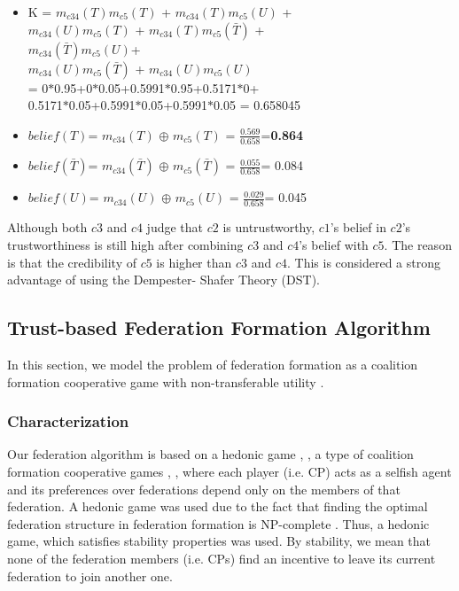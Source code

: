 \documentclass[preprint]{elsarticle}
\theoremstyle{definition}
\theoremstyle{remark}
\theoremstyle{property}
\begin{document}
\begin{itemize}
\item K = $m_{c34}(T)m_{c5}(T)$ + $m_{c34}(T)m_{c5}(U)$ + \\
$m_{c34}(U)m_{c5}(T)$ + $m_{c34}(T)m_{c5}(\bar{T})$ + \\ $m_{c34}(\bar{T})m_{c5}(U)$+ \\
$m_{c34}(U)m_{c5}(\bar{T})$ + $m_{c34}(U)m_{c5}(U)$ \\

= 0$\ast$0.95+0$\ast$0.05+0.5991$\ast$0.95+0.5171$\ast$0+ \\
0.5171$\ast$0.05+0.5991$\ast$0.05+0.5991$\ast$0.05 = 0.658045\\

\item $belief(T)$= $m_{c34}(T)$ $\oplus$ $m_{c5}(T)$ = $\frac{0.569}{0.658}$=\textbf{0.864} \\
\item $belief(\bar{T})$= $m_{c34}(\bar{T})$ $\oplus$ $m_{c5}(\bar{T})$ = $\frac{0.055}{0.658}$= 0.084 \\
\item $belief(U)$= $m_{c34}(U)$ $\oplus$ $m_{c5}(U)$ = $\frac{0.029}{0.658}$= 0.045 \\
\end{itemize}

Although both $c3$ and $c4$ judge that $c2$ is untrustworthy,
$c1$'s belief in $c2$'s trustworthiness is still high after combining
$c3$ and $c4$'s belief with $c5$. The reason is that
the credibility of $c5$ is higher than $c3$ and $c4$. This is
considered a strong advantage of using the Dempester-
Shafer Theory (DST).

\subsection{Trust-based Federation Formation Algorithm}
In this section, we model the problem of federation
formation as a coalition formation cooperative game with
non-transferable utility \cite{bogomolnaia2002stability}.

\subsubsection{Characterization}

Our federation algorithm is based on a hedonic game
\cite{bogomolnaia2002stability}, \cite{dreze1980hedonic}, a type of coalition formation cooperative
games \cite{ray2007game}, \cite{dreze1980hedonic}, \cite{apt2009generic} where each player (i.e. CP)
acts as a selfish agent and its preferences over
federations depend only on the members of that federation. A hedonic game was used due to the fact that finding the optimal federation structure in federation formation is NP-complete \cite{sandholm1999coalition}. Thus, a hedonic game, which satisfies stability
properties was used. By stability, we mean that none of the federation members (i.e. CPs) find an incentive to leave its current federation to join another one.
\end{document}
